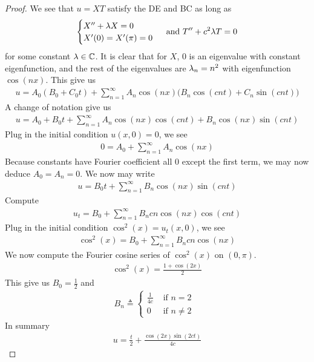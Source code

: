 \documentclass{report}
\begin{document}
\begin{proof}
  We see that $u=XT$ satisfy the DE and BC as long as 
   \begin{align*}
  \begin{cases}
    X''+ \lambda X=0  \\
    X'(0)=X'(\pi )=0
  \end{cases} \text{ and } T''+c^2 \lambda  T=0
  \end{align*}
for some constant $\lambda \in\mathbb{C}$. It is clear that for $X$, $0$ is an eigenvalue with constant eigenfunction, and the rest of the eigenvalues are $\lambda_n=n^2$ with eigenfunction $\cos (nx)$. This give us 
\begin{align*}
u=A_0 (B_0+C_0t)+\sum_{n=1}^{\infty} A_n\cos (nx) \big(B_n \cos (cnt)+C_n \sin (cnt)  \big)
\end{align*}
A change of notation give us  
\begin{align*}
u=A_0+B_0t + \sum_{n=1}^{\infty} A_n \cos (nx)\cos (cnt) + B_n \cos (nx)\sin (cnt)
\end{align*}
Plug in the initial condition $u(x,0)=0$, we see 
\begin{align*}
0=A_0+ \sum_{n=1}^{\infty}A_n \cos (nx)
\end{align*}
Because constants have Fourier coefficient all $0$ except the first term, we may now deduce $A_0=A_n=0$. We now may write 
 \begin{align*}
u=B_0t+\sum_{n=1}^{\infty} B_n \cos (nx)\sin (cnt)
\end{align*}
Compute 
\begin{align*}
u_t=B_0 + \sum_{n=1}^{\infty}B_ncn \cos (nx)\cos (cnt)
\end{align*}
Plug in the initial condition $\cos^2(x)=u_t(x,0)$, we see 
\begin{align*}
\cos ^2(x)=B_0 + \sum_{n=1}^{\infty}B_ncn\cos (nx)
\end{align*}
We now compute the Fourier cosine series of $\cos ^2(x)$ on $(0,\pi )$. 
\begin{align*}
\cos^2(x)=  \frac{1+\cos (2x)}{2}
\end{align*}
This give us $B_0= \frac{1}{2}$ and 
\begin{align*}
B_n\triangleq \begin{cases}
  \frac{1}{4c}& \text{ if $n=2$ }\\
  0& \text{ if $n\neq 2$ }
\end{cases}
\end{align*}
In summary 
\begin{align*}
u=\frac{t}{2}+ \frac{\cos (2x)\sin (2ct) }{4c}
\end{align*}
\end{proof}
\end{document}
